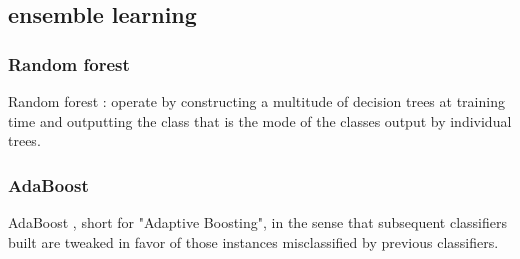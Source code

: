 \subsection{ensemble learning}

\subsubsection{Random forest}

Random forest \cite{breiman2001random}: operate by constructing a multitude of decision trees at training time and outputting the class that is the mode of the classes output by individual trees. 

\subsubsection{AdaBoost}



AdaBoost \cite{freund1997decision}, short for "Adaptive Boosting", in the sense that subsequent classifiers built are tweaked in favor of those instances misclassified by previous classifiers. 